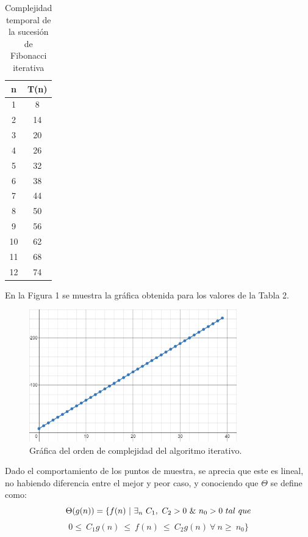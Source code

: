 \documentclass[12pt,twoside]{article}
\begin{document}
    \begin{longtable}{||c|c||}
        \caption{Complejidad temporal de la sucesi\'on de Fibonacci iterativa}\\
            \hline
                \textbf{n}&\textbf{T(n)}\\
            \hline
                {1}&{8}\\
            \hline
                {2}&{14}\\
            \hline
                {3}&{20}\\
            \hline
                {4}&{26}\\
            \hline
                {5}&{32}\\
            \hline
                {6}&{38}\\
            \hline
                {7}&{44}\\
            \hline
                {8}&{50}\\
            \hline
                {9}&{56}\\
            \hline
                {10}&{62}\\
            \hline
                {11}&{68}\\
            \hline
                {12}&{74}\\
            \hline
    \end{longtable}
En la Figura 1 se muestra la gr\'afica obtenida para los valores de la Tabla 2.
\begin{figure}[h]
    \centering
    \includegraphics[width=9cm]{imagenes/grafica211.png}
    \caption{Gr\'afica del orden de complejidad del algoritmo iterativo.}
    \label{fig:my_label}
\end{figure}
Dado el comportamiento de los puntos de muestra, se aprecia que este es lineal, no habiendo diferencia entre el mejor y peor caso, y conociendo que $\Theta$ se define como:
$$\Theta(g(n)) = \{ f(n)~\arrowvert~\exists_{n}~C_{1},~C_{2}>0~\&~n_{0}>0~tal~que$$ $$0\leq~C_{1}g(n)~\leq~f(n)~\leq~C_{2}g(n)~\forall~n\geq~n_{0}\}$$
\end{document}
